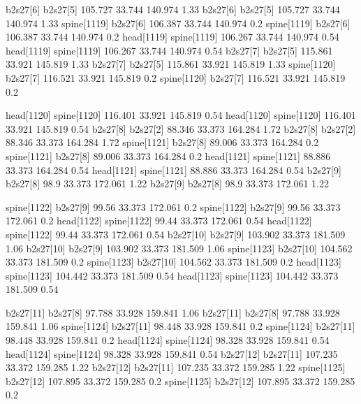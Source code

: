 b2s27[6]    b2s27[5]    105.727    33.744    140.974    1.33
b2s27[6]    b2s27[5]    105.727    33.744    140.974    1.33
spine[1119]    b2s27[6]    106.387    33.744    140.974    0.2
spine[1119]    b2s27[6]    106.387    33.744    140.974    0.2
head[1119]    spine[1119]    106.267    33.744    140.974    0.54
head[1119]    spine[1119]    106.267    33.744    140.974    0.54
b2s27[7]    b2s27[5]    115.861    33.921    145.819    1.33
b2s27[7]    b2s27[5]    115.861    33.921    145.819    1.33
spine[1120]    b2s27[7]    116.521    33.921    145.819    0.2
spine[1120]    b2s27[7]    116.521    33.921    145.819    0.2


head[1120]    spine[1120]    116.401    33.921    145.819    0.54
head[1120]    spine[1120]    116.401    33.921    145.819    0.54
b2s27[8]    b2s27[2]    88.346    33.373    164.284    1.72
b2s27[8]    b2s27[2]    88.346    33.373    164.284    1.72
spine[1121]    b2s27[8]    89.006    33.373    164.284    0.2
spine[1121]    b2s27[8]    89.006    33.373    164.284    0.2
head[1121]    spine[1121]    88.886    33.373    164.284    0.54
head[1121]    spine[1121]    88.886    33.373    164.284    0.54
b2s27[9]    b2s27[8]    98.9    33.373    172.061    1.22
b2s27[9]    b2s27[8]    98.9    33.373    172.061    1.22


spine[1122]    b2s27[9]    99.56    33.373    172.061    0.2
spine[1122]    b2s27[9]    99.56    33.373    172.061    0.2
head[1122]    spine[1122]    99.44    33.373    172.061    0.54
head[1122]    spine[1122]    99.44    33.373    172.061    0.54
b2s27[10]    b2s27[9]    103.902    33.373    181.509    1.06
b2s27[10]    b2s27[9]    103.902    33.373    181.509    1.06
spine[1123]    b2s27[10]    104.562    33.373    181.509    0.2
spine[1123]    b2s27[10]    104.562    33.373    181.509    0.2
head[1123]    spine[1123]    104.442    33.373    181.509    0.54
head[1123]    spine[1123]    104.442    33.373    181.509    0.54


b2s27[11]    b2s27[8]    97.788    33.928    159.841    1.06
b2s27[11]    b2s27[8]    97.788    33.928    159.841    1.06
spine[1124]    b2s27[11]    98.448    33.928    159.841    0.2
spine[1124]    b2s27[11]    98.448    33.928    159.841    0.2
head[1124]    spine[1124]    98.328    33.928    159.841    0.54
head[1124]    spine[1124]    98.328    33.928    159.841    0.54
b2s27[12]    b2s27[11]    107.235    33.372    159.285    1.22
b2s27[12]    b2s27[11]    107.235    33.372    159.285    1.22
spine[1125]    b2s27[12]    107.895    33.372    159.285    0.2
spine[1125]    b2s27[12]    107.895    33.372    159.285    0.2


